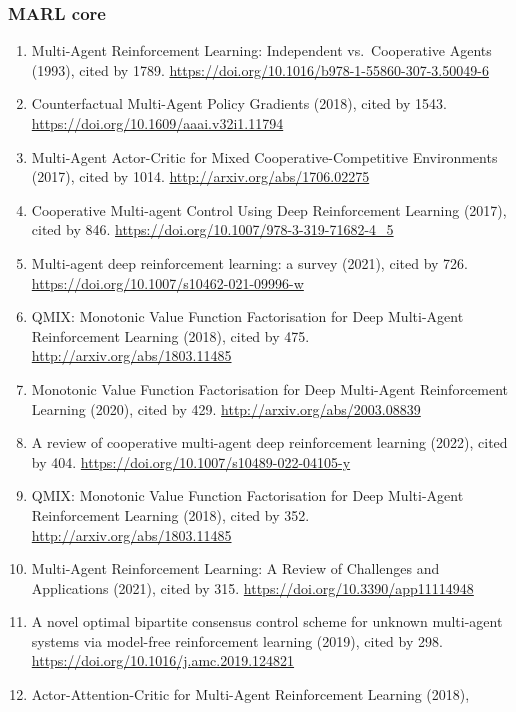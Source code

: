 \documentclass[
]{article}
\providecommand{\tightlist}{%
  \setlength{\itemsep}{0pt}\setlength{\parskip}{0pt}}
\begin{document}
\hypertarget{marl-core}{%
\subsubsection{MARL core}\label{marl-core}}

\begin{enumerate}
\def\labelenumi{\arabic{enumi}.}
\tightlist
\item
  Multi-Agent Reinforcement Learning: Independent vs.~Cooperative Agents
  (1993), cited by 1789.
  \url{https://doi.org/10.1016/b978-1-55860-307-3.50049-6}
\item
  Counterfactual Multi-Agent Policy Gradients (2018), cited by 1543.
  \url{https://doi.org/10.1609/aaai.v32i1.11794}
\item
  Multi-Agent Actor-Critic for Mixed Cooperative-Competitive
  Environments (2017), cited by 1014.
  \url{http://arxiv.org/abs/1706.02275}
\item
  Cooperative Multi-agent Control Using Deep Reinforcement Learning
  (2017), cited by 846.
  \url{https://doi.org/10.1007/978-3-319-71682-4_5}
\item
  Multi-agent deep reinforcement learning: a survey (2021), cited by
  726. \url{https://doi.org/10.1007/s10462-021-09996-w}
\item
  QMIX: Monotonic Value Function Factorisation for Deep Multi-Agent
  Reinforcement Learning (2018), cited by 475.
  \url{http://arxiv.org/abs/1803.11485}
\item
  Monotonic Value Function Factorisation for Deep Multi-Agent
  Reinforcement Learning (2020), cited by 429.
  \url{http://arxiv.org/abs/2003.08839}
\item
  A review of cooperative multi-agent deep reinforcement learning
  (2022), cited by 404. \url{https://doi.org/10.1007/s10489-022-04105-y}
\item
  QMIX: Monotonic Value Function Factorisation for Deep Multi-Agent
  Reinforcement Learning (2018), cited by 352.
  \url{http://arxiv.org/abs/1803.11485}
\item
  Multi-Agent Reinforcement Learning: A Review of Challenges and
  Applications (2021), cited by 315.
  \url{https://doi.org/10.3390/app11114948}
\item
  A novel optimal bipartite consensus control scheme for unknown
  multi-agent systems via model-free reinforcement learning (2019),
  cited by 298. \url{https://doi.org/10.1016/j.amc.2019.124821}
\item
  Actor-Attention-Critic for Multi-Agent Reinforcement Learning (2018),

\end{enumerate}
\end{document}
